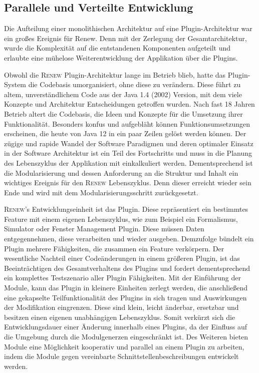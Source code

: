 	\subsection{Parallele und Verteilte Entwicklung}\label{sub:vez}
		Die Aufteilung einer monolithischen Architektur auf eine Plugin-Architektur war ein großes Ereignis für Renew. Denn mit der Zerlegung der Gesamtarchitektur, wurde die Komplexität auf die entstandenen Komponenten aufgeteilt und erlaubte eine mühelose Weiterentwicklung der Applikation über die Plugins. \bigbreak

		Obwohl die \textsc{Renew} Plugin-Architektur lange im Betrieb blieb, hatte das Plugin-System die Codebasis umorganisiert, ohne diese zu verändern. Diese führt zu altem, unverständlichem Code aus der Java 1.4 (2002) Version, mit dem viele Konzepte und Architektur Entscheidungen getroffen wurden. Nach fast 18 Jahren Betrieb altert die Codebasis, die Ideen und Konzepte für die Umsetzung ihrer Funktionalität. Besonders konfus und aufgebläht können Funktionsumsetzungen erscheinen, die heute von Java 12 in ein paar Zeilen gelöst werden können. Der zügige und rapide Wandel der Software Paradigmen und deren optimaler Einsatz in der Software Architektur ist ein Teil des Fortschritts und muss in die Planung des Lebenszyklus der Applikation mit einkalkuliert werden. \newline
		Dementsprechend ist die Modularisierung und dessen Anforderung an die Struktur und Inhalt ein wichtiges Ereignis für den \textsc{Renew} Lebenszyklus. Denn dieser erreicht wieder sein Ende und wird mit dem Modularisierungsschritt zurückgesetzt. \bigbreak

		\textsc{Renew}'s Entwicklungseinheit ist das Plugin. Diese repräsentiert ein bestimmtes Feature mit einem eigenen Lebenszyklus, wie zum Beispiel ein Formalismus, Simulator oder Fenster Management Plugin. Diese müssen Daten entgegennehmen, diese verarbeiten und wieder ausgeben. Demzufolge bündelt ein Plugin mehrere Fähigkeiten, die zusammen ein Feature verkörpern. Der wesentliche Nachteil einer Codeänderungen in einem größeren Plugin, ist das Beeinträchtigen des Gesamtverhaltens des Plugins und fordert dementsprechend ein komplettes Testszenario aller Plugin Fähigkeiten.\newline
		Mit der Einführung der Module, kann das Plugin in kleinere Einheiten zerlegt werden, die anschließend eine gekapselte Teilfunktionalität des Plugins in sich tragen und Auswirkungen der Modifikation eingrenzen. Diese sind klein, leicht änderbar, ersetzbar und besitzen einen eigenen unabhängigen Lebenszyklus. Somit verkürzt sich die Entwicklungsdauer einer Änderung innerhalb eines Plugins, da der Einfluss auf die Umgebung durch die Modulgenerzen eingeschränkt ist. Des Weiteren  bieten Module eine Möglichkeit kooperativ und parallel an einem Plugin zu arbeiten, indem die Module gegen vereinbarte Schnittstellenbeschreibungen entwickelt werden. \bigbreak

